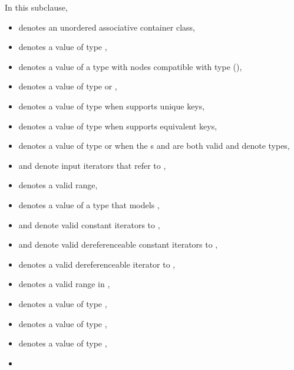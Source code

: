 \pnum
{}%
%
%
%
%
%
In this subclause,
\begin{itemize}
\item
{} denotes an unordered associative container class,
\item
{} denotes a value of type ,
\item
{} denotes a value of a type with nodes compatible
  with type  (),
\item
{} denotes a value of type  or ,
\item
{} denotes a value of type 
  when  supports unique keys,
\item
{} denotes a value of type 
  when  supports equivalent keys,
\item
{} denotes a value of type  or 
  when the s
   and
  are both valid and denote types,
\item
{} and  denote input iterators
  that refer to ,
\item
\tcode{[i, j)} denotes a valid range,
\item
{} denotes a value of a type 
that models ,
\item
{} and  denote valid constant iterators to ,
\item
{} and  denote
  valid dereferenceable constant iterators to ,
\item
{} denotes a valid dereferenceable iterator to ,
\item
\tcode{[q1, q2)} denotes a valid range in ,
\item
{} denotes a value of type ,
\item
{} denotes a value of type ,
\item
{} denotes a value of type ,
\item

\end{itemize}
